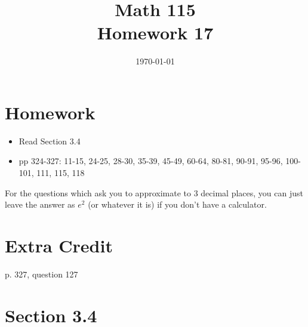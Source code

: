 \documentclass[fleqn,addpoints]{exam}
\title{Math 115 \\ Homework 17}
\date{\today}
\begin{document}
\maketitle


\section{Homework}

\begin{itemize}
  \item Read Section 3.4
  \item pp 324-327: 11-15, 24-25, 28-30, 35-39, 45-49, 60-64, 80-81, 90-91, 95-96, 100-101, 111, 115, 118
\end{itemize}

For the questions which ask you to approximate to 3 decimal places, you can just leave the answer as $e^2$ (or whatever
it is) if you don't have a calculator.

\section{Extra Credit}

p. 327, question 127

\ifprintanswers

\section{Section 3.4}
\end{document}

